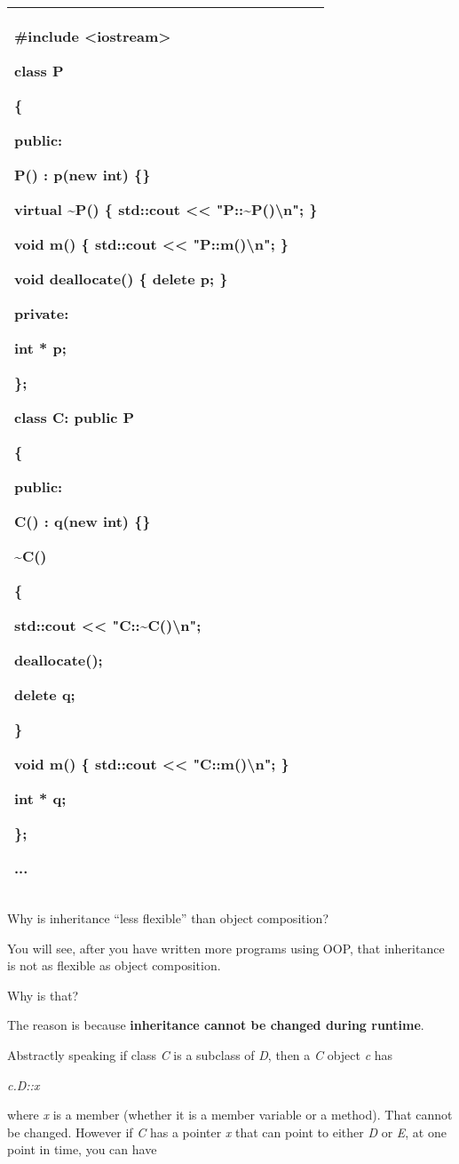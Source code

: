 \documentclass[
]{article}
\begin{document}
\begin{longtable}[]{@{}l@{}}
\toprule
\endhead
\begin{minipage}[t]{0.97\columnwidth}\raggedright
\#include \textless iostream\textgreater{}

class P

\{

public:

P() : p(new int) \{\}

\textbf{ }virtual \textasciitilde P() \{ std::cout \textless\textless{}
"P::\textasciitilde P()\textbackslash n"; \}

void m() \{ std::cout \textless\textless{} "P::m()\textbackslash n"; \}

void deallocate() \{ delete p; \}

private:

int * p;

\};

class C: public P

\{

public:

C() : q(new int) \{\}

\textasciitilde C()

\{

std::cout \textless\textless{} "C::\textasciitilde C()\textbackslash n";

deallocate();

delete q;

\}

void m() \{ std::cout \textless\textless{} "C::m()\textbackslash n"; \}

int * q;

\};

...\strut
\end{minipage}\tabularnewline
\bottomrule
\end{longtable}

Why is inheritance ``less flexible'' than object composition?

You will see, after you have written more programs using OOP, that
inheritance is not as flexible as object composition.

Why is that?

The reason is because \textbf{inheritance cannot be changed during
runtime}.

Abstractly speaking if class \emph{C} is a subclass of \emph{D}, then a
\emph{C} object \emph{c} has

\emph{c.D::x}

where \emph{x} is a member (whether it is a member variable or a
method). That cannot be changed. However if \emph{C} has a pointer
\emph{x} that can point to either \emph{D} or \emph{E}, at one point in
time, you can have
\end{document}
